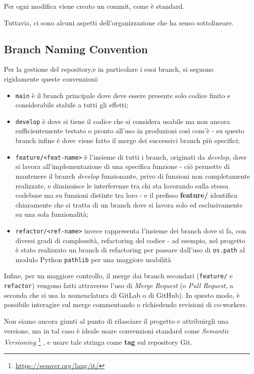 Per ogni modifica viene creato un commit, come è standard.

Tuttavia, ci sono alcuni aspetti dell'organizzazione che ha senso sottolineare.

\subsection{Branch Naming Convention}
Per la gestione del repository,e in particolare i suoi branch, si seguono rigidamente queste convenzioni:
\begin{itemize}
    \item \texttt{main} è il branch principale dove deve essere presente solo codice finito e considerabile stabile a tutti gli effetti;
    \item \texttt{develop} è dove si tiene il codice che si considera usabile ma non ancora sufficientemente testato o pronto all'uso in produzioni così com'è - su questo branch infine è dove viene fatto il merge dei successivi branch più specifici;
    \item \texttt{feature/<feat-name>} è l'insieme di tutti i branch, originati da \emph{develop}, dove si lavora all'implementazione di una specifica funzione - ciò permette di mantenere il branch \emph{develop} funzionante, privo di funzioni non completamente realizzate, e diminuisce le interferenze tra chi sta lavorando sulla stessa codebase ma su funzioni distinte tra loro - e il prefisso \textbf{feature/} identifica chiaramente che si tratta di un branch dove si lavora solo ed esclusivamente su una sola funzionalità;
    \item \texttt{refactor/<ref-name>} invece rappresenta l'insieme dei branch dove si fa, con diversi gradi di complessità, refactoring del codice - ad esempio, nel progetto è stato realizzato un branch di refactoring per passare dall'uso di \texttt{os.path} al modulo Python \texttt{pathlib} per una maggiore usabilità
\end{itemize}

Infine, per un maggiore controllo, il merge dai branch secondari (\texttt{feature/} e \texttt{refactor}) vengono fatti attraverso l'uso di \emph{Merge Request} (o \emph{Pull Request}, a seconda che si usa la nomenclatura di GitLab o di GitHub).
In questo modo, è possibile interagire sul merge commentando o richiedendo revisioni di co-workers.

Non siamo ancora giunti al punto di rilasciare il progetto e attribuirgli una versione, ma in tal caso è ideale usare convenzioni standard come \emph{Semantic Versioning}
\footnote{\url{https://semver.org/lang/it/}}
, e usare tale stringa come \textbf{tag} sul repository Git.

